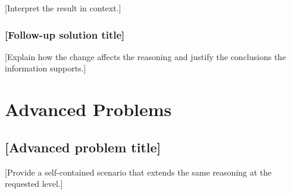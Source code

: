 [Interpret the result in context.]


\subsubsection*{[Follow-up solution title]}
\label{sol:example-follow-up}

[Explain how the change affects the reasoning and justify the conclusions the information supports.]


\section{Advanced Problems}
\label{sec:advanced}


\subsection{[Advanced problem title]}
\label{prob:advanced}

[Provide a self-contained scenario that extends the same reasoning at the requested level.]



